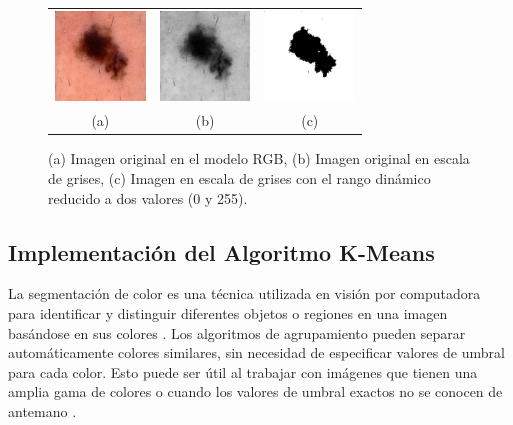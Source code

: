 \begin{figure}[h] 
\begin{center} 
 \begin{tabular}{ccc}
        \includegraphics[width=2.4cm]{images/F01-A.png} &
        \includegraphics[width=2.4cm]{images/F01-B.png} & 
        \includegraphics[width=2.4cm]{images/F01-C.png} \\
    (a) & (b) & (c)\\
  \end{tabular}
\end{center} 
\vspace{-10pt}
\caption{\footnotesize (a) Imagen original en el modelo RGB, (b) Imagen original en escala de grises, (c) Imagen en escala de grises con el rango dinámico reducido a dos valores (0 y 255).}  
\label{fig02} 
\end{figure}

\subsection{Implementación del Algoritmo K-Means}

La segmentación de color es una técnica utilizada en visión por computadora para identificar y distinguir diferentes objetos o regiones en una imagen basándose en sus colores \autocite{Anju:2019, Anju:2019, Dhanachandra:2015}. Los algoritmos de agrupamiento pueden separar automáticamente colores similares, sin necesidad de especificar valores de umbral para cada color. Esto puede ser útil al trabajar con imágenes que tienen una amplia gama de colores o cuando los valores de umbral exactos no se conocen de antemano \autocite{Bolat-2022}. 

